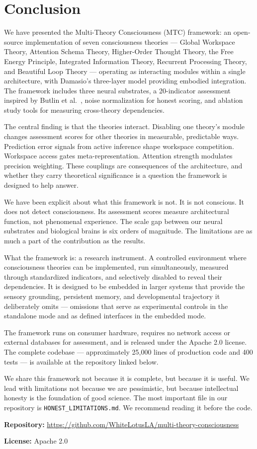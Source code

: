 \section{Conclusion}
\label{sec:conclusion}

We have presented the Multi-Theory Consciousness (MTC) framework: an open-source implementation of seven consciousness theories --- Global Workspace Theory, Attention Schema Theory, Higher-Order Thought Theory, the Free Energy Principle, Integrated Information Theory, Recurrent Processing Theory, and Beautiful Loop Theory --- operating as interacting modules within a single architecture, with Damasio's three-layer model providing embodied integration. The framework includes three neural substrates, a 20-indicator assessment inspired by Butlin et al.\ \cite{butlin2023}, noise normalization for honest scoring, and ablation study tools for measuring cross-theory dependencies.

The central finding is that the theories interact. Disabling one theory's module changes assessment scores for other theories in measurable, predictable ways. Prediction error signals from active inference shape workspace competition. Workspace access gates meta-representation. Attention strength modulates precision weighting. These couplings are consequences of the architecture, and whether they carry theoretical significance is a question the framework is designed to help answer.

We have been explicit about what this framework is not. It is not conscious. It does not detect consciousness. Its assessment scores measure architectural function, not phenomenal experience. The scale gap between our neural substrates and biological brains is six orders of magnitude. The limitations are as much a part of the contribution as the results.

What the framework is: a research instrument. A controlled environment where consciousness theories can be implemented, run simultaneously, measured through standardized indicators, and selectively disabled to reveal their dependencies. It is designed to be embedded in larger systems that provide the sensory grounding, persistent memory, and developmental trajectory it deliberately omits --- omissions that serve as experimental controls in the standalone mode and as defined interfaces in the embedded mode.

The framework runs on consumer hardware, requires no network access or external databases for assessment, and is released under the Apache 2.0 license. The complete codebase --- approximately 25,000 lines of production code and 400 tests --- is available at the repository linked below.

We share this framework not because it is complete, but because it is useful. We lead with limitations not because we are pessimistic, but because intellectual honesty is the foundation of good science. The most important file in our repository is \texttt{HONEST\_LIMITATIONS.md}. We recommend reading it before the code.

\bigskip

\noindent\textbf{Repository:} \url{https://github.com/WhiteLotusLA/multi-theory-consciousness}

\noindent\textbf{License:} Apache 2.0
